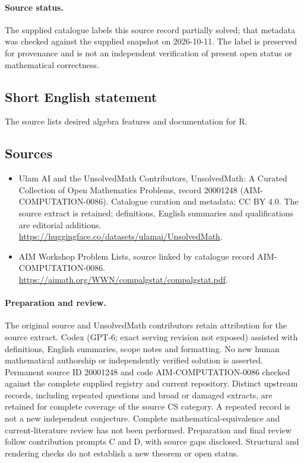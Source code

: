 \documentclass[11pt]{article}
\begin{document}
\paragraph{Source status.}
The supplied catalogue labels this source record partially solved; that metadata was checked against the supplied snapshot on 2026-10-11. The label is preserved for provenance and is not an independent verification of present open status or mathematical correctness.
\subsection{Short English statement}
The source lists desired algebra features and documentation for R.
\subsection{Sources}
\begin{itemize}
\item[\hypertarget{source:20001248:1}{S1}] Ulam AI and the UnsolvedMath Contributors, UnsolvedMath: A Curated Collection of Open Mathematics Problems, record 20001248 (AIM-COMPUTATION-0086). Catalogue curation and metadata: CC BY 4.0. The source extract is retained; definitions, English summaries and qualifications are editorial additions.
\url{https://huggingface.co/datasets/ulamai/UnsolvedMath}.
\item[\hypertarget{source:20001248:2}{S2}] AIM Workshop Problem Lists, source linked by catalogue record AIM-COMPUTATION-0086.
\url{https://aimath.org/WWN/compalgstat/compalgstat.pdf}.
\end{itemize}
\paragraph{Preparation and review.}
The original source and UnsolvedMath contributors retain attribution for the source extract. Codex (GPT-6; exact serving revision not exposed) assisted with definitions, English summaries, scope notes and formatting. No new human mathematical authorship or independently verified solution is asserted. Permanent source ID 20001248 and code AIM-COMPUTATION-0086 checked against the complete supplied registry and current repository. Distinct upstream records, including repeated questions and broad or damaged extracts, are retained for complete coverage of the source CS category. A repeated record is not a new independent conjecture. Complete mathematical-equivalence and current-literature review has not been performed. Preparation and final review follow contribution prompts C and D, with source gaps disclosed. Structural and rendering checks do not establish a new theorem or open status.
\label{end:20001248}
\end{document}

